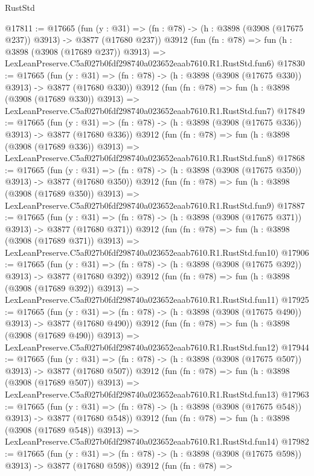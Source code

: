 \begin{lexlean}{RustStd}
\begin{coremodule}
@17811 := @17665
    (fun (y : @31) => (fn : @78) -> (h : @3898 (@3908 (@17675 @237)) @3913) -> @3877 (@17680 @237))
    @3912
    (fun (fn : @78) =>
    fun (h : @3898 (@3908 (@17689 @237)) @3913) =>
    LexLeanPreserve.C5af027b0fdf298740a023652eaab7610.R1.RustStd.fun6)
@17830 := @17665
    (fun (y : @31) => (fn : @78) -> (h : @3898 (@3908 (@17675 @330)) @3913) -> @3877 (@17680 @330))
    @3912
    (fun (fn : @78) =>
    fun (h : @3898 (@3908 (@17689 @330)) @3913) =>
    LexLeanPreserve.C5af027b0fdf298740a023652eaab7610.R1.RustStd.fun7)
@17849 := @17665
    (fun (y : @31) => (fn : @78) -> (h : @3898 (@3908 (@17675 @336)) @3913) -> @3877 (@17680 @336))
    @3912
    (fun (fn : @78) =>
    fun (h : @3898 (@3908 (@17689 @336)) @3913) =>
    LexLeanPreserve.C5af027b0fdf298740a023652eaab7610.R1.RustStd.fun8)
@17868 := @17665
    (fun (y : @31) => (fn : @78) -> (h : @3898 (@3908 (@17675 @350)) @3913) -> @3877 (@17680 @350))
    @3912
    (fun (fn : @78) =>
    fun (h : @3898 (@3908 (@17689 @350)) @3913) =>
    LexLeanPreserve.C5af027b0fdf298740a023652eaab7610.R1.RustStd.fun9)
@17887 := @17665
    (fun (y : @31) => (fn : @78) -> (h : @3898 (@3908 (@17675 @371)) @3913) -> @3877 (@17680 @371))
    @3912
    (fun (fn : @78) =>
    fun (h : @3898 (@3908 (@17689 @371)) @3913) =>
    LexLeanPreserve.C5af027b0fdf298740a023652eaab7610.R1.RustStd.fun10)
@17906 := @17665
    (fun (y : @31) => (fn : @78) -> (h : @3898 (@3908 (@17675 @392)) @3913) -> @3877 (@17680 @392))
    @3912
    (fun (fn : @78) =>
    fun (h : @3898 (@3908 (@17689 @392)) @3913) =>
    LexLeanPreserve.C5af027b0fdf298740a023652eaab7610.R1.RustStd.fun11)
@17925 := @17665
    (fun (y : @31) => (fn : @78) -> (h : @3898 (@3908 (@17675 @490)) @3913) -> @3877 (@17680 @490))
    @3912
    (fun (fn : @78) =>
    fun (h : @3898 (@3908 (@17689 @490)) @3913) =>
    LexLeanPreserve.C5af027b0fdf298740a023652eaab7610.R1.RustStd.fun12)
@17944 := @17665
    (fun (y : @31) => (fn : @78) -> (h : @3898 (@3908 (@17675 @507)) @3913) -> @3877 (@17680 @507))
    @3912
    (fun (fn : @78) =>
    fun (h : @3898 (@3908 (@17689 @507)) @3913) =>
    LexLeanPreserve.C5af027b0fdf298740a023652eaab7610.R1.RustStd.fun13)
@17963 := @17665
    (fun (y : @31) => (fn : @78) -> (h : @3898 (@3908 (@17675 @548)) @3913) -> @3877 (@17680 @548))
    @3912
    (fun (fn : @78) =>
    fun (h : @3898 (@3908 (@17689 @548)) @3913) =>
    LexLeanPreserve.C5af027b0fdf298740a023652eaab7610.R1.RustStd.fun14)
@17982 := @17665
    (fun (y : @31) => (fn : @78) -> (h : @3898 (@3908 (@17675 @598)) @3913) -> @3877 (@17680 @598))
    @3912
    (fun (fn : @78) =>

\end{coremodule}
\end{lexlean}
